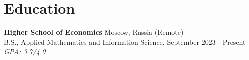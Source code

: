 \section{\sc Education}

\textbf{Higher School of Economics} \hfill Moscow, Russia (Remote) \\
B.S., Applied Mathematics and Information Science. \hfill September 2023 - Present\\
\textit{GPA: 3.7/4.0}

\endinput

